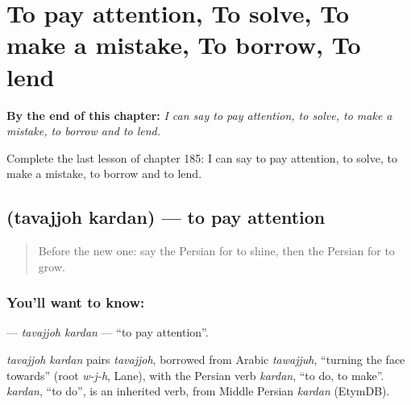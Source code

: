 
\chapter{To pay attention, To solve, To make a mistake, To borrow, To lend}
\label{ch:fa-to-pay-attention-to-solve-to-make-a-mistake-to-borrow-to-lend}

\begin{chapteropening}
\textbf{By the end of this chapter:} \emph{I can say to pay attention, to solve, to make a mistake, to borrow and to lend.}

Complete the last lesson of chapter 185: I can say to pay attention, to solve, to make a mistake, to borrow and to lend.
\end{chapteropening}

\section[\texorpdfstring{\fa{توجه} \fa{کردن} (tavajjoh kardan)}{توجه کردن (tavajjoh kardan)}]{  (tavajjoh kardan) — to pay attention}

\label{lesson:FA-C185-tavajjoh-kardan}



\begin{quote}
Before the new one: say the Persian for to shine, then the Persian for to grow.
\end{quote}

\subsection*{You'll want to know:  }
\textbf{ } — \emph{tavajjoh kardan} — \textquotedblleft{}to pay attention\textquotedblright{}.

\begin{cousinweb}
\emph{tavajjoh kardan} pairs \emph{tavajjoh}, borrowed from Arabic \emph{tawajjuh}, \textquotedblleft{}turning the face towards\textquotedblright{} (root \emph{w-j-h}, Lane), with the Persian verb \emph{kardan}, \textquotedblleft{}to do, to make\textquotedblright{}. \emph{kardan}, \textquotedblleft{}to do\textquotedblright{}, is an inherited verb, from Middle Persian \emph{kardan} (EtymDB).
\end{cousinweb}

